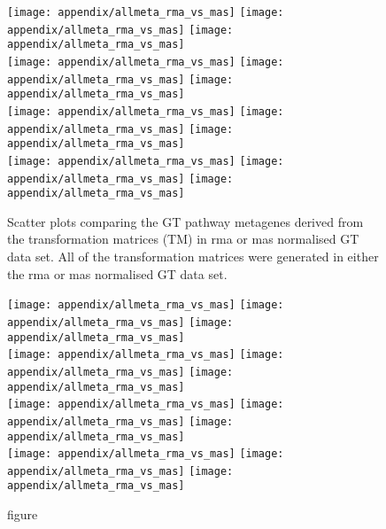 	\begin{figure}[htp!]
		\centering
		\texttt{[image: appendix/allmeta\_rma\_vs\_mas]}
		\texttt{[image: appendix/allmeta\_rma\_vs\_mas]}
		\texttt{[image: appendix/allmeta\_rma\_vs\_mas]}\\
		\texttt{[image: appendix/allmeta\_rma\_vs\_mas]}
		\texttt{[image: appendix/allmeta\_rma\_vs\_mas]}
		\texttt{[image: appendix/allmeta\_rma\_vs\_mas]}\\
		\texttt{[image: appendix/allmeta\_rma\_vs\_mas]}
		\texttt{[image: appendix/allmeta\_rma\_vs\_mas]}
		\texttt{[image: appendix/allmeta\_rma\_vs\_mas]}\\
		\texttt{[image: appendix/allmeta\_rma\_vs\_mas]}
		\texttt{[image: appendix/allmeta\_rma\_vs\_mas]}
		\texttt{[image: appendix/allmeta\_rma\_vs\_mas]}\\
		\caption[]{Scatter plots comparing the GT pathway metagenes derived from the transformation matrices (TM) in \gls{rma} or \gls{mas} normalised GT data set.
		All of the transformation matrices were generated in either the \gls{rma} or \gls{mas} normalised GT data set.
		}
		\label{fig:appendix/gt_meta_rma_mas}
	\end{figure}

	\begin{figure}[htpb]
		\ContinuedFloat
		\captionsetup{list=off,format=cont}
		\centering
		\texttt{[image: appendix/allmeta\_rma\_vs\_mas]}
		\texttt{[image: appendix/allmeta\_rma\_vs\_mas]}
		\texttt{[image: appendix/allmeta\_rma\_vs\_mas]}\\
		\texttt{[image: appendix/allmeta\_rma\_vs\_mas]}
		\texttt{[image: appendix/allmeta\_rma\_vs\_mas]}
		\texttt{[image: appendix/allmeta\_rma\_vs\_mas]}\\
		\texttt{[image: appendix/allmeta\_rma\_vs\_mas]}
		\texttt{[image: appendix/allmeta\_rma\_vs\_mas]}
		\texttt{[image: appendix/allmeta\_rma\_vs\_mas]}\\
		\texttt{[image: appendix/allmeta\_rma\_vs\_mas]}
		\texttt{[image: appendix/allmeta\_rma\_vs\_mas]}
		\texttt{[image: appendix/allmeta\_rma\_vs\_mas]}\\
		\caption[]{figure}
	\end{figure}

